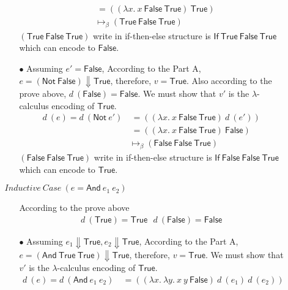 \documentclass[a4paper,answers]{exam}
\begin{document}
\begin{itemize}
\begin{solution}
\begin{itemize}[leftmargin=*]
\begin{itemize}[leftmargin=*]
\begin{align*}
                    &\ = ((\lambda x.\ x\ \mathsf{False\ True})\ \mathsf{True})\\
                    & \mapsto_\beta (\mathsf{True\ False\ True})
                \end{align*}
                $(\mathsf{True\ False\ True})$ write in if-then-else structure is $\mathsf{If\ True\ False\ True}$ which can encode to $\mathsf{False}$. \\
                \item[$\bullet$] Assuming $e' = \mathsf{False}$, According to the Part A, $e = (\mathsf{Not}\ \mathsf{False}) \Downarrow \mathsf{True}$, therefore, $v = \mathsf{True}$. Also according to the prove above, $d\ (\mathsf{False}) = \mathsf{False}$. We must show that $v'$ is the $\lambda$-calculus encoding of $\mathsf{True}$.
                \begin{align*}
                    d\ (e) = d\ (\mathsf{Not}\ e')&\  =  ((\lambda x.\ x\ \mathsf{False\ True})\ d\ (e'))\\
                    &\ = ((\lambda x.\ x\ \mathsf{False\ True})\ \mathsf{False})\\
                    & \mapsto_\beta (\mathsf{False\ False\ True})
                \end{align*}
                $(\mathsf{False\ False\ True})$ write in if-then-else structure is $\mathsf{If\ False\ False\ True}$ which can encode to $\mathsf{True}$.\\
            \end{itemize}
            \item[] $Inductive\ Case\ (e = \mathsf{And}\ e_1\ e_2)$
            \begin{itemize}[leftmargin=*]
                \item[] According to the prove above
                \begin{gather*}
                    d\ (\mathsf{True}) = \mathsf{True}\ \ \ 
                    d\ (\mathsf{False}) = \mathsf{False}
                \end{gather*}
                \item[$\bullet$] Assuming $e_1 \Downarrow \mathsf{True}, e_2 \Downarrow \mathsf{True}$, According to the Part A, $e = (\mathsf{And\ True\ True}) \Downarrow \mathsf{True}$, therefore, $v = \mathsf{True}$.  We must show that $v'$ is the $\lambda$-calculus encoding of $\mathsf{True}$.
                \begin{align*}
                    d\ (e) = d\ (\mathsf{And}\ e_1\ e_2) &\ = ((\lambda x.\ \lambda y.\ x\ y\ \mathsf{False})\ d\ (e_1)\ d\ (e_2))\\

\end{align*}
\end{itemize}
\end{itemize}
\end{solution}
\end{itemize}
\end{document}
